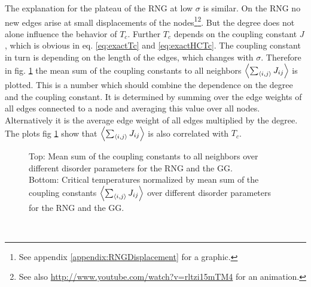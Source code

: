     The explanation for the plateau of the RNG at low \(\sigma\) is similar.
    On the RNG no new edges arise at small displacements of the nodes\footnote{See appendix \ref{appendix:RNGDisplacement} for a graphic.}\footnote{See also \url{http://www.youtube.com/watch?v=rltzi15mTM4} for an animation.}.
    But the degree does not alone influence the behavior of \(T_c\).
    Further \(T_c\) depends on the coupling constant \(J\), which is
    obvious in eq. \eqref{eq:exactTc} and \eqref{eq:exactHCTc}. The
    coupling constant in turn is depending on the length of the edges,
    which changes with \(\sigma\).
    Therefore  in fig. \ref{fig:TcJ}
    the mean sum of the coupling constants to all neighbors \(\left< \sum_{\left< i,j \right>} J_{ij} \right>\)
    is plotted. This is a number which should combine the dependence on
    the degree and the coupling constant. It is determined by summing
    over the edge weights of all edges connected to a node and averaging
    this value over all nodes. Alternatively it is the average edge weight
    of all edges multiplied by the degree.
    The plots fig \ref{fig:TcJ}
    show that \(\left< \sum_{\left< i,j \right>} J_{ij} \right>\) is also correlated with \(T_c\).
    \begin{figure}[htbp]
        \centering


        \caption[Critical Temperature Normalized by Mean Sum of the Coupling Constants]
        {
            Top: Mean sum of the coupling constants to all
            neighbors over different disorder parameters for
             the RNG and
             the GG.\\
            Bottom: Critical temperatures normalized by mean sum of the
            coupling constants \(\left< \sum_{\left< i,j \right>} J_{ij} \right>\) over different
            disorder parameters for
             the RNG and
             the GG.
        }
        \label{fig:TcJ}
    \end{figure}\\
